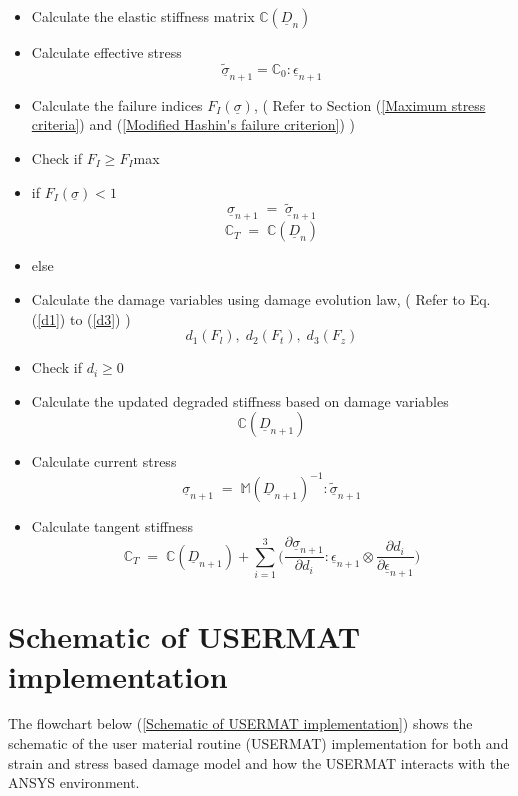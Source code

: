 \documentclass[12pt,a4paper,twoside,openright]{report}
\begin{document}
\begin{itemize}
\item Calculate the elastic stiffness matrix  \textbf{$\mathbb{C}(\underline{D}_{n})$}
\item Calculate effective stress \textbf{$$\underline{\tilde{\sigma}}_{n+1} = \mathbb{C}_{0} : \underline{\epsilon}_{n+1} $$}
\item Calculate the failure indices \textbf{$F_{I}(\underline{\sigma})$},\;\; ( Refer to Section (\ref{Maximum stress criteria}) and (\ref{Modified Hashin's failure criterion}) )
\item[] Check if $F_{I} \geq F_{I}$max
\item if \textbf{$F_{I}(\underline{\sigma})<1$} \textbf{$$\underline{\sigma}_{n+1} \; = \; \underline{\tilde{\sigma}}_{n+1} $$} \textbf{$$\mathbb{C}_{T} \; = \; \mathbb{C}(\underline{D}_{n})$$}
\item else
   	
\item[]  Calculate the damage variables using damage evolution law, \;\; ( Refer to Eq. (\ref{d1}) to (\ref{d3}) )  \textbf{$$d_{1}(F_{l}),\;d_{2}(F_{t}),\;d_{3}(F_{z})$$}  	
\item[]  Check if $d_{i} \geq 0 $ 
\item[]  Calculate the updated degraded stiffness based on damage variables \textbf{$$\mathbb{C}(\underline{D}_{n+1})$$}
\item[]  Calculate current stress  \textbf{$$\underline{\sigma}_{n+1} \; = \;  \mathbb{M}(\underline{D}_{n+1})^{-1}:\underline{\tilde{\sigma}}_{n+1} $$}
\item[] Calculate tangent stiffness \textbf{$$\mathbb{C}_{T}  \; = \;\mathbb{C}(\underline{D}_{n+1}) + \sum_{i = 1}^{3} \Big( \frac{\partial \underline{\sigma}_{n+1} }{\partial d_{i}} : \underline{\epsilon}_{n+1} \otimes \frac{\partial d_{i}}{\partial \underline{\epsilon}_{n+1} }\Big)$$}
	
\end{itemize} 

\newpage
\section{Schematic of USERMAT implementation}
\indent\indent\indent The flowchart below (\ref{Schematic of USERMAT implementation}) shows the schematic of the user material routine (USERMAT) implementation for both and strain and stress based damage model and how the USERMAT interacts with the ANSYS environment.\\
\end{document}
